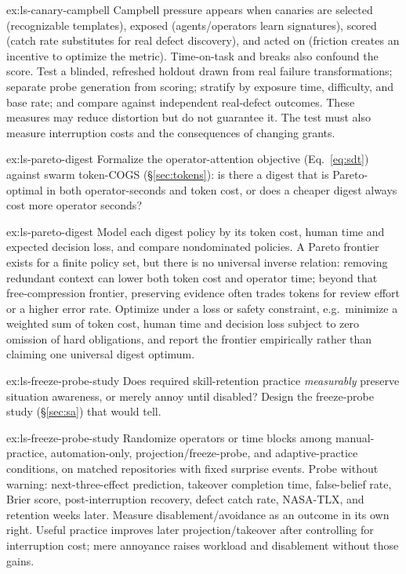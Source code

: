 \documentclass[11pt,a4paper]{article}
\theoremstyle{definition}
\theoremstyle{plain}
\begin{document}
\begin{pdsolution}{ex:ls-canary-campbell}
Campbell pressure appears when canaries are selected (recognizable templates), exposed (agents/operators learn signatures), scored (catch rate substitutes for real defect discovery), and acted on (friction creates an incentive to optimize the metric). Time-on-task and breaks also confound the score. Test a blinded, refreshed holdout drawn from real failure transformations; separate probe generation from scoring; stratify by exposure time, difficulty, and base rate; and compare against independent real-defect outcomes. These measures may reduce distortion but do not guarantee it. The test must also measure interruption costs and the consequences of changing grants.
\end{pdsolution}
\begin{pdexercise}[kind=Open,rating=3]{ex:ls-pareto-digest}
Formalize the operator-attention objective (Eq.~\ref{eq:sdt})
against swarm token-COGS (\S\ref{sec:tokens}): is there a digest that is
Pareto-optimal in both operator-seconds and token cost, or does a cheaper digest
always cost more operator seconds?
\end{pdexercise}
\begin{pdsolution}{ex:ls-pareto-digest}
Model each digest policy by its token cost, human time and expected decision loss, and compare nondominated policies. A Pareto frontier exists for a finite policy set, but there is no universal inverse relation: removing redundant context can lower both token cost and operator time; beyond that free-compression frontier, preserving evidence often trades tokens for review effort or a higher error rate. Optimize under a loss or safety constraint, e.g.\ minimize a weighted sum of token cost, human time and decision loss subject to zero omission of hard obligations, and report the frontier empirically rather than claiming one universal digest optimum.
\end{pdsolution}
\begin{pdexercise}[kind=Open,rating=3]{ex:ls-freeze-probe-study}
Does required skill-retention practice
\emph{measurably} preserve situation awareness, or merely annoy until disabled? Design the
freeze-probe study (\S\ref{sec:sa}) that would tell.
\end{pdexercise}
\begin{pdsolution}{ex:ls-freeze-probe-study}
Randomize operators or time blocks among manual-practice, automation-only, projection/freeze-probe, and adaptive-practice conditions, on matched repositories with fixed surprise events. Probe without warning: next-three-effect prediction, takeover completion time, false-belief rate, Brier score, post-interruption recovery, defect catch rate, NASA-TLX, and retention weeks later. Measure disablement/avoidance as an outcome in its own right. Useful practice improves later projection/takeover after controlling for interruption cost; mere annoyance raises workload and disablement without those gains.
\end{pdsolution}
\end{document}
